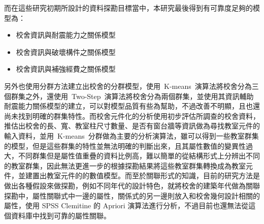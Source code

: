 而在這些研究初期所設計的資料探勘目標當中，本研究最後得到有可靠度足夠的模型為：

\begin{itemize}
  \item 校舍資訊與耐震能力之關係模型
  \item 校舍資訊與破壞構件之關係模型
  \item 校舍資訊與補強經費之關係模型
\end{itemize}

另外也使用分群方法建立出校舍的分群模型，使用~K-means~演算法將校舍分為三個群集之外，還使用~Two-Step~演算法將校舍分為兩個群集，並使用其資訊輔助耐震能力關係模型的建立，可以對模型品質有些為幫助，不過改善不明顯，且也還尚未找到明確的群集特性。而校舍元件化的分析使用初步評估所調查的校舍資料，推估出校舍的長、寬、教室柱尺寸數量、是否有窗台牆等資訊做為尋找教室元件的輸入資料，並用~K-means~分群做為主要的分析演算法，雖可以得到一些教室群集的模型，但是這些群集的特性並無法明確的判斷出來，且其屬性數值的變異性過大，不同群集但是屬性值重疊的資料比例高，難以簡單的從結構形式上分辨出不同的教室群集，因此無法更進一步的根據探勘結果將這些教室群集轉換成為教室元件，並建置出教室元件的的數值模型。而至於關聯形式的知識，目前的研究方法是做出各種假設來做探勘，例如不同年代的設計特色，就將校舍的建築年代做為關聯探勘中，屬性關聯式中一邊的屬性，關係式的另一邊則放入和校舍幾何設計相關的屬性，使用 SPSS Clemitine 的 Apriori 演算法進行分析，不過目前也還無法從這個資料庫中找到可靠的屬性關聯。


